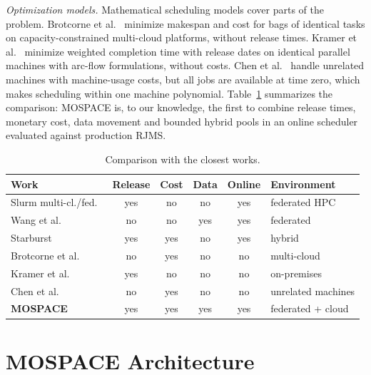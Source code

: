 \documentclass[conference]{IEEEtran}
\begin{document}
\emph{Optimization models.}
Mathematical scheduling models cover parts of the problem. Brotcorne et al.~\cite{Brotcorne2023} minimize makespan and cost for bags of identical tasks on capacity-constrained multi-cloud platforms, without release times. Kramer et al.~\cite{Kramer2020} minimize weighted completion time with release dates on identical parallel machines with arc-flow formulations, without costs. Chen et al.~\cite{Chen2024} handle unrelated machines with machine-usage costs, but all jobs are available at time zero, which makes scheduling within one machine polynomial. Table~\ref{tab:literature} summarizes the comparison: MOSPACE is, to our knowledge, the first to combine release times, monetary cost, data movement and bounded hybrid pools in an online scheduler evaluated against production RJMS.

\begin{table}[t]
\centering\footnotesize
\setlength{\tabcolsep}{3pt}
\caption{Comparison with the closest works.}
\label{tab:literature}
\setlength{\tabcolsep}{2pt}
\begin{tabular}{lccccl}
\toprule
Work & Release & Cost & Data & Online & Environment \\
\midrule
Slurm multi-cl./fed.~\cite{Jette2023} & yes & no & no & yes & federated HPC \\
Wang et al.~\cite{Wang2025Efficient} & no & no & yes & yes & federated \\
Starburst~\cite{Luo24} & yes & yes & no & yes & hybrid \\
Brotcorne et al.~\cite{Brotcorne2023} & no & yes & no & no & multi-cloud \\
Kramer et al.~\cite{Kramer2020} & yes & no & no & no & on-premises \\
Chen et al.~\cite{Chen2024} & no & yes & no & no & unrelated machines \\
\textbf{MOSPACE} & yes & yes & yes & yes & federated + cloud \\
\bottomrule
\end{tabular}
\end{table}

\section{MOSPACE Architecture}
\label{sec:system}
\end{document}
